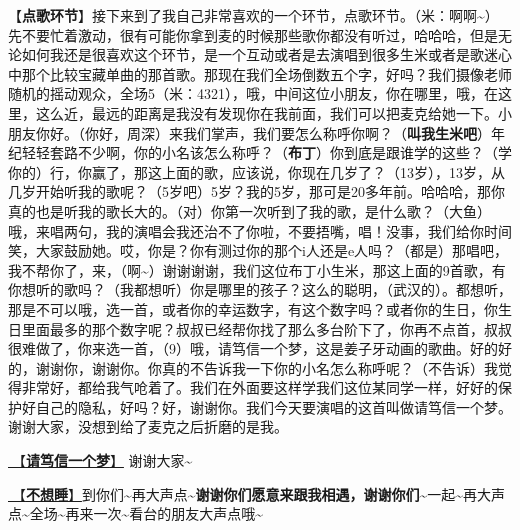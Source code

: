 \documentclass[]{ctexbook}
\begin{document}
【\textbf{点歌环节}】接下来到了我自己非常喜欢的一个环节，点歌环节。（米：啊啊\textasciitilde）先不要忙着激动，很有可能你拿到麦的时候那些歌你都没有听过，哈哈哈，但是无论如何我还是很喜欢这个环节，是一个互动或者是去演唱到很多生米或者是歌迷心中那个比较宝藏单曲的那首歌。那现在我们全场倒数五个字，好吗？我们摄像老师随机的摇动观众，全场5（米：4321），哦，中间这位小朋友，你在哪里，哦，在这里，这么近，最远的距离是我没有发现你在我前面，我们可以把麦克给她一下。小朋友你好。（你好，周深）来我们掌声，我们要怎么称呼你啊？（\textbf{叫我生米吧}）年纪轻轻套路不少啊，你的小名该怎么称呼？（\textbf{布丁}）你到底是跟谁学的这些？（学你的）行，你赢了，那这上面的歌，应该说，你现在几岁了？（13岁），13岁，从几岁开始听我的歌呢？（5岁吧）5岁？我的5岁，那可是20多年前。哈哈哈，那你真的也是听我的歌长大的。（对）你第一次听到了我的歌，是什么歌？（大鱼）哦，来唱两句，我的演唱会我还治不了你啦，不要捂嘴，唱！没事，我们给你时间笑，大家鼓励她。哎，你是？你有测过你的那个i人还是e人吗？（都是）那唱吧，我不帮你了，来，（啊\textasciitilde）谢谢谢谢，我们这位布丁小生米，那这上面的9首歌，有你想听的歌吗？（我都想听）你是哪里的孩子？这么的聪明，（武汉的）。都想听，那是不可以哦，选一首，或者你的幸运数字，有这个数字吗？或者你的生日，你生日里面最多的那个数字呢？叔叔已经帮你找了那么多台阶下了，你再不点首，叔叔很难做了，你来选一首，（9）哦，请笃信一个梦，这是姜子牙动画的歌曲。好的好的，谢谢你，谢谢你。你真的不告诉我一下你的小名怎么称呼呢？（不告诉）我觉得非常好，都给我气呛着了。我们在外面要这样学我们这位某同学一样，好好的保护好自己的隐私，好吗？好，谢谢你。我们今天要演唱的这首叫做请笃信一个梦。谢谢大家，没想到给了麦克之后折磨的是我。

\hyperref[believe-your-dream]{🎵【\textbf{请笃信一个梦}】} 谢谢大家\textasciitilde{}

\hyperref[keep-playing]{🎵【\textbf{不想睡}】}到你们\textasciitilde 再大声点\textasciitilde{}\textbf{谢谢你们愿意来跟我相遇，谢谢你们\textasciitilde{}}一起\textasciitilde 再大声点\textasciitilde 全场\textasciitilde 再来一次\textasciitilde 看台的朋友大声点哦\textasciitilde{}
\end{document}
